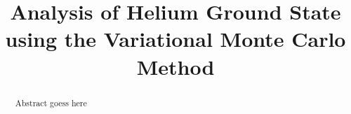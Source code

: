 \documentclass[conference]{IEEEtran}
\begin{document}
\title{Analysis of Helium Ground State using the Variational Monte Carlo Method}


\author{
\and
{}
\and
{}
}


\maketitle


\begin{abstract}

Abstract goess here

\end{abstract}

\IEEEpeerreviewmaketitle















\end{document}
